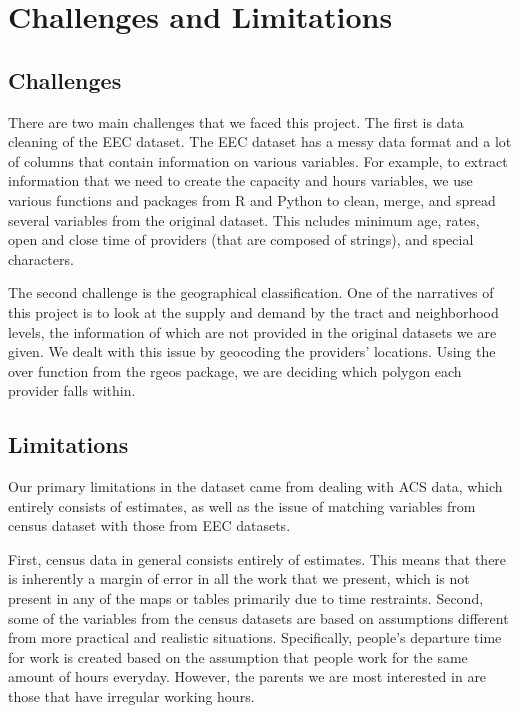 \documentclass[10pt,letterpaper]{article}
\begin{document}
\section{Challenges and Limitations}\label{challenges-and-limitations}

\subsection{Challenges}\label{challenges}

There are two main challenges that we faced this project. The first is
data cleaning of the EEC dataset. The EEC dataset has a messy data
format and a lot of columns that contain information on various
variables. For example, to extract information that we need to create
the capacity and hours variables, we use various functions and packages
from R and Python to clean, merge, and spread several variables from the
original dataset. This ncludes minimum age, rates, open and close time
of providers (that are composed of strings), and special characters.

The second challenge is the geographical classification. One of the
narratives of this project is to look at the supply and demand by the
tract and neighborhood levels, the information of which are not provided
in the original datasets we are given. We dealt with this issue by
geocoding the providers' locations. Using the over function from the
rgeos package, we are deciding which polygon each provider falls within.

\subsection{Limitations}\label{limitations}

Our primary limitations in the dataset came from dealing with ACS data,
which entirely consists of estimates, as well as the issue of matching
variables from census dataset with those from EEC datasets.

First, census data in general consists entirely of estimates. This means
that there is inherently a margin of error in all the work that we
present, which is not present in any of the maps or tables primarily due
to time restraints. Second, some of the variables from the census
datasets are based on assumptions different from more practical and
realistic situations. Specifically, people's departure time for work is
created based on the assumption that people work for the same amount of
hours everyday. However, the parents we are most interested in are those
that have irregular working hours.
\end{document}
